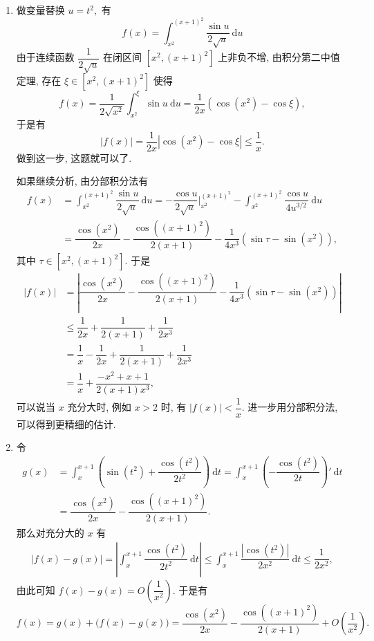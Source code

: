 \begin{solution}
\begin{enumerate}
\item 做变量替换 $u = t^2,$ 有
\begin{equation*}
f(x) = \int_{x^2}^{(x+1)^2} \dfrac{\sin u}{2\sqrt{u}} ~ \mathrm{d} u
\end{equation*}
由于连续函数 $\dfrac{1}{2\sqrt{u}}$ 在闭区间 $[x^2, (x+1)^2]$ 上非负不增, 由积分第二中值定理, 存在 $\xi \in [x^2, (x+1)^2]$ 使得
\begin{equation*}
f(x) = \dfrac{1}{2\sqrt{x^2}} \int_{x^2}^{\xi} \sin u ~ \mathrm{d} u = \dfrac{1}{2x} ( \cos (x^2) - \cos \xi),
\end{equation*}
于是有
\begin{equation*}
| f(x) | = \dfrac{1}{2x} | \cos (x^2) - \cos \xi| \leqslant \dfrac{1}{x}.
\end{equation*}
做到这一步, 这题就可以了.

如果继续分析, 由分部积分法有
\begin{align*}
f(x) & = \int_{x^2}^{(x+1)^2} \dfrac{\sin u}{2\sqrt{u}} ~ \mathrm{d} u = -\dfrac{\cos u}{2\sqrt{u}} \bigg|_{x^2}^{(x+1)^2} - \int_{x^2}^{(x+1)^2} \dfrac{\cos u}{4 u^{3/2}} ~ \mathrm{d} u \\
& = \dfrac{\cos(x^2)}{2x} - \dfrac{\cos((x+1)^2)}{2(x+1)} - \dfrac{1}{4x^3} (\sin \tau - \sin (x^2)),
\end{align*}
其中 $\tau \in [x^2, (x+1)^2].$ 于是
\begin{align*}
| f(x) | & = \left\lvert \dfrac{\cos(x^2)}{2x} - \dfrac{\cos((x+1)^2)}{2(x+1)} - \dfrac{1}{4x^3} (\sin \tau - \sin (x^2)) \right\rvert \\
& \leqslant \dfrac{1}{2x} + \dfrac{1}{2(x+1)} + \dfrac{1}{2x^3} \\
& = \dfrac{1}{x} - \dfrac{1}{2x} + \dfrac{1}{2(x+1)} + \dfrac{1}{2x^3} \\
& = \dfrac{1}{x} + \dfrac{-x^2 + x + 1}{2(x+1)x^3},
\end{align*}
可以说当 $x$ 充分大时, 例如 $x > 2$ 时, 有 $| f(x) | < \dfrac{1}{x}.$ 进一步用分部积分法, 可以得到更精细的估计.

\item 令
\begin{align*}
g(x) & = \int_x^{x+1} \left( \sin(t^2) + \dfrac{\cos(t^2)}{2t^2} \right) ~ \mathrm{d}t = \int_x^{x+1} \left( - \dfrac{\cos(t^2)}{2t} \right)' ~ \mathrm{d}t \\
& = \dfrac{\cos(x^2)}{2x} - \dfrac{\cos((x+1)^2)}{2(x+1)}.
\end{align*}
那么对充分大的 $x$ 有
\begin{align*}
\left| f(x) - g(x) \right| = \left| \int_x^{x+1} \dfrac{\cos(t^2)}{2t^2} ~ \mathrm{d}t \right| \leqslant \int_x^{x+1} \dfrac{\left| \cos(t^2) \right|}{2x^2} ~ \mathrm{d}t \leqslant \dfrac{1}{2x^2},
\end{align*}
由此可知 $\displaystyle f(x) - g(x) = O \left( \dfrac{1}{x^2} \right).$ 于是有
$$f(x) = g(x) + \big(f(x) - g(x)\big) = \dfrac{\cos(x^2)}{2x} - \dfrac{\cos((x+1)^2)}{2(x+1)} + O \left( \dfrac{1}{x^2} \right).$$


\end{enumerate}
\end{solution}
